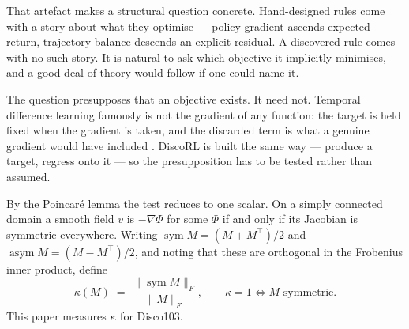 \documentclass[11pt]{article}
\theoremstyle{remark}
\newcommand{\sym}{\operatorname{sym}}
\newcommand{\asym}{\operatorname{asym}}
\begin{document}
That artefact makes a structural question concrete. Hand-designed rules come
with a story about what they optimise --- policy gradient ascends expected
return, trajectory balance \cite{malkin2022tb} descends an explicit residual.
A discovered rule comes with no such story. It is natural to ask which objective
it implicitly minimises, and a good deal of theory would follow if one could
name it.

The question presupposes that an objective exists. It need not. Temporal
difference learning famously is not the gradient of any function: the target is
held fixed when the gradient is taken, and the discarded term is what a genuine
gradient would have included \cite{baird1995residual,sutton2009gtd}. DiscoRL is
built the same way --- produce a target, regress onto it --- so the
presupposition has to be tested rather than assumed.

By the Poincar\'e lemma the test reduces to one scalar. On a simply connected
domain a smooth field $v$ is $-\nabla \Phi$ for some $\Phi$ if and only if its
Jacobian is symmetric everywhere. Writing $\sym M = (M + M^\top)/2$ and
$\asym M = (M - M^\top)/2$, and noting that these are orthogonal in the Frobenius
inner product, define
\begin{equation}
  \kappa(M) \;=\; \frac{\lVert \sym M \rVert_F}{\lVert M \rVert_F},
  \qquad \kappa = 1 \iff M \text{ symmetric}.
  \label{eq:kappa}
\end{equation}
This paper measures $\kappa$ for Disco103.
\end{document}
